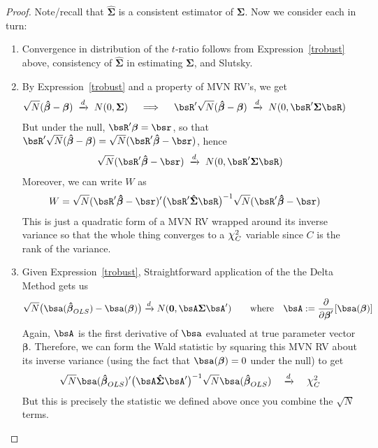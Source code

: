\documentclass[12pt]{article}
\theoremstyle{plain}
\theoremstyle{definition}
\theoremstyle{remark}
\newcommand*{\Chi}{\mbox{\large$\chi$}} %
\newcommand{\bsSigma}{\boldsymbol{\Sigma}}
\newcommand{\bsbeta}{\boldsymbol{\beta}}
\newcommand{\bshatbeta}{\boldsymbol{\hat{\beta}}}
\newcommand{\bshatSigma}{\boldsymbol{\hat{\Sigma}}}
\renewcommand{\bso}{\boldsymbol{0}}
\newcommand{\dto}{\xrightarrow{d}}
\begin{document}
\begin{proof}
Note/recall that $\bshatSigma$ is a consistent estimator of $\bsSigma$.
Now we consider each in turn:
\begin{enumerate}
  \item Convergence in distribution of the $t$-ratio follows from
    Expression~\ref{trobust} above, consistency of $\bshatSigma$ in
    estimating $\bsSigma$, and Slutsky.

  \item
    By Expression~\ref{trobust} and a property of MVN RV's, we get
    \begin{align*}
      \sqrt{N}(\bshatbeta - \bsbeta)
      \; &\dto \;
      N(0,\bsSigma)
      \quad\implies\quad
      \bsR'\sqrt{N}(\bshatbeta - \bsbeta)
      \; \dto \;
      N(0,\bsR'\bsSigma\bsR)
    \end{align*}
    But under the null, $\bsR'\bsbeta = \bsr$, so that
    $\bsR'\sqrt{N}(\bshatbeta - \bsbeta)
    =
    \sqrt{N}(\bsR'\bshatbeta - \bsr)$,
    hence
    \begin{align*}
      \sqrt{N}(\bsR'\bshatbeta - \bsr)
      \; \dto \;
      N(0,\bsR'\bsSigma\bsR)
    \end{align*}
    Moreover, we can write $W$ as
    \begin{align*}
      W &=
      \sqrt{N}
      (\bsR'\bshatbeta-\bsr)'
      \big(
      \bsR'\bshatSigma\bsR
      \big)^{-1}
      \sqrt{N}
      (\bsR'\bshatbeta-\bsr)
    \end{align*}
    This is just a quadratic form of a MVN RV wrapped around its inverse
    variance so that the whole thing converges to a $\Chi^2_C$ variable
    since $C$ is the rank of the variance.

  \item
    Given Expression~\ref{trobust}, Straightforward application of the
    the Delta Method gets us
    \begin{align*}
      \sqrt{N}\big(
        \bsa(\bshatbeta_{OLS})
        -
        \bsa(\bsbeta)
      \big)
      \dto N(\bso,\bsA \bsSigma \bsA')
      \qquad \text{where}\quad
      \bsA := \frac{\partial}{\partial \bsbeta'}[\bsa(\bsbeta)]
    \end{align*}
    Again, $\bsA$ is the first derivative of $\bsa$ evaluated at true
    parameter vector $\bsbeta$. Therefore, we can form the Wald
    statistic by squaring this MVN RV about its inverse variance (using
    the fact that $\bsa(\bsbeta)=0$ under the null) to get
    \begin{align*}
      \sqrt{N}
      \bsa(\bshatbeta_{OLS})'
      \big(
      \bsA \bshatSigma \bsA'
      \big)^{-1}
      \sqrt{N}
      \bsa(\bshatbeta_{OLS})
      \quad \dto\quad \Chi^2_C
    \end{align*}
    But this is precisely the statistic we defined above once you
    combine the $\sqrt{N}$ terms.
\end{enumerate}
\end{proof}
\end{document}
